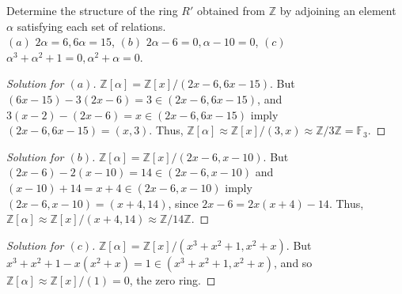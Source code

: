 \documentclass[12pt]{article}
\theoremstyle{remark}
\begin{document}
\begin{problem}
  Determine the structure of the ring $R'$ obtained from $\mathbb{Z}$ by adjoining an element $\alpha$ satisfying each set of relations.\\
  $(a)$ $2\alpha=6,6\alpha=15$, $(b)$ $2\alpha-6=0,\alpha-10=0$, $(c)$ $\alpha^3+\alpha^2+1=0,\alpha^2+\alpha=0$.
\end{problem}
\begin{proof}[Solution for $(a)$]
  $\mathbb{Z}[\alpha] = \mathbb{Z}[x]/(2x-6,6x-15)$. But $(6x-15) - 3(2x-6) = 3 \in (2x-6,6x-15)$, and $3(x-2)-(2x-6) = x \in (2x-6,6x-15)$ imply $(2x-6,6x-15) = (x,3)$. Thus, $\mathbb{Z}[\alpha] \approx \mathbb{Z}[x]/(3,x) \approx \mathbb{Z}/3\mathbb{Z} = \mathbb{F}_3$.
\end{proof}
\begin{proof}[Solution for $(b)$]
  $\mathbb{Z}[\alpha] = \mathbb{Z}[x]/(2x-6,x-10)$. But $(2x-6) - 2(x-10) = 14 \in (2x-6,x-10)$ and $(x-10) + 14 = x + 4 \in (2x-6,x-10)$ imply $(2x-6,x-10) = (x+4,14)$, since $2x - 6 = 2x(x+4) - 14$. Thus, $\mathbb{Z}[\alpha] \approx \mathbb{Z}[x]/(x+4,14) \approx \mathbb{Z}/14\mathbb{Z}$.
\end{proof}
\begin{proof}[Solution for $(c)$]
  $\mathbb{Z}[\alpha] = \mathbb{Z}[x]/(x^3+x^2+1,x^2+x)$. But $x^3+x^2+1-x(x^2+x) = 1 \in (x^3+x^2+1,x^2+x)$, and so $\mathbb{Z}[\alpha] \approx \mathbb{Z}[x]/(1) = 0$, the zero ring.
\end{proof}
\end{document}
